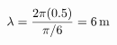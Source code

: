 \documentclass[preview]{standalone}
\begin{document}
\begin{align*}
\special{dvisvgm:raw <g id='unique000'>}\lambda = \frac{2\pi(0.5)}{\pi/6} = 6\,\mathrm{m}\special{dvisvgm:raw </g>}
\end{align*}
\end{document}
